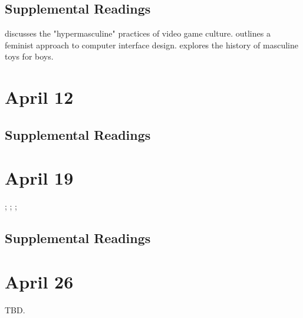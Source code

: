 \documentclass[11pt]{article}
\begin{document}

\subsection{Supplemental Readings}
\label{sec:org4079b1b}

\cite{Salter:2012fa} discusses the "hypermasculine" practices of video game culture.  \cite{Bardzell:2010dv} outlines a feminist approach to computer interface design. \cite{Varney:2002en} explores the history of masculine toys for boys.  




\section{April 12}
\label{sec:orge00144e}


\subsection{Supplemental Readings}
\label{sec:orgb329030}

\cite{Shaw:2015dr}

\section{April 19}
\label{sec:orga889f99}

; ; ; \cite{Gray:2014uj}

\subsection{Supplemental Readings}
\label{sec:org725b302}

\cite{Ruberg:2017ww}

\section{April 26}
\label{sec:org1907822}

TBD.

\newpage

\nocite{*} 
\printbibliography
\end{document}
